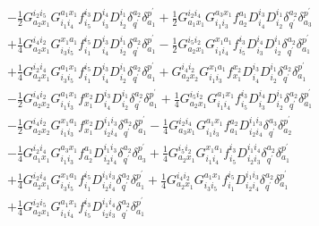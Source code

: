 \documentclass[aip,onecolumn,preprint]{revtex4-1}
\begin{document}
\begin{align}
  & - {{{\frac{1}{2}}}{G^{{i_2}{i_5}}_{{a_2}{x_1}}}{G^{{a_1}{x_1}}_{{i_1}{i_4}}}{f^{{i_3}}_{{i_5}}}{D^{{i_4}}_{{i_3}}}{D^{{i_1}}_{{i_2}}}{\delta^{{a_2}}_{q^\prime}}{\delta^{p^\prime}_{{a_1}}}} + {{{\frac{1}{2}}}{G^{{i_2}{i_4}}_{{a_1}{x_1}}}{G^{{a_3}{x_1}}_{{i_1}{i_3}}}{f^{{a_1}}_{{a_2}}}{D^{{i_3}}_{{i_4}}}{D^{{i_1}}_{{i_2}}}{\delta^{{a_2}}_{q^\prime}}{\delta^{p^\prime}_{{a_3}}}} \nonumber \\
  & + {{{\frac{1}{4}}}{G^{{i_4}{i_2}}_{{a_2}{x_1}}}{G^{{x_1}{a_1}}_{{i_3}{i_5}}}{f^{{i_5}}_{{i_1}}}{D^{{i_3}}_{{i_4}}}{D^{{i_1}}_{{i_2}}}{\delta^{{a_2}}_{q^\prime}}{\delta^{p^\prime}_{{a_1}}}} - {{{\frac{1}{2}}}{G^{{i_5}{i_2}}_{{a_2}{x_1}}}{G^{{x_1}{a_1}}_{{i_1}{i_4}}}{f^{{i_3}}_{{i_5}}}{D^{{i_4}}_{{i_3}}}{D^{{i_1}}_{{i_2}}}{\delta^{{a_2}}_{q^\prime}}{\delta^{p^\prime}_{{a_1}}}} \nonumber \\
  & + {{{\frac{1}{4}}}{G^{{i_2}{i_4}}_{{a_2}{x_1}}}{G^{{a_1}{x_1}}_{{i_3}{i_5}}}{f^{{i_5}}_{{i_1}}}{D^{{i_3}}_{{i_4}}}{D^{{i_1}}_{{i_2}}}{\delta^{{a_2}}_{q^\prime}}{\delta^{p^\prime}_{{a_1}}}} + {{G^{{i_4}{i_2}}_{{a_2}{x_2}}}{G^{{x_1}{a_1}}_{{i_1}{i_3}}}{f^{{x_2}}_{{x_1}}}{D^{{i_3}}_{{i_4}}}{D^{{i_1}}_{{i_2}}}{\delta^{{a_2}}_{q^\prime}}{\delta^{p^\prime}_{{a_1}}}} \nonumber \\
  & - {{{\frac{1}{2}}}{G^{{i_4}{i_2}}_{{a_2}{x_2}}}{G^{{a_1}{x_1}}_{{i_1}{i_3}}}{f^{{x_2}}_{{x_1}}}{D^{{i_3}}_{{i_4}}}{D^{{i_1}}_{{i_2}}}{\delta^{{a_2}}_{q^\prime}}{\delta^{p^\prime}_{{a_1}}}} + {{{\frac{1}{4}}}{G^{{i_5}{i_2}}_{{a_2}{x_1}}}{G^{{a_1}{x_1}}_{{i_1}{i_4}}}{f^{{i_3}}_{{i_5}}}{D^{{i_4}}_{{i_3}}}{D^{{i_1}}_{{i_2}}}{\delta^{{a_2}}_{q^\prime}}{\delta^{p^\prime}_{{a_1}}}} \nonumber \\
  & - {{{\frac{1}{2}}}{G^{{i_4}{i_2}}_{{a_2}{x_2}}}{G^{{x_1}{a_1}}_{{i_1}{i_3}}}{f^{{x_2}}_{{x_1}}}{D^{{i_1}{i_3}}_{{i_2}{i_4}}}{\delta^{{a_2}}_{q^\prime}}{\delta^{p^\prime}_{{a_1}}}} - {{{\frac{1}{4}}}{G^{{i_2}{i_4}}_{{a_3}{x_1}}}{G^{{a_1}{x_1}}_{{i_1}{i_3}}}{f^{{a_2}}_{{a_1}}}{D^{{i_1}{i_3}}_{{i_2}{i_4}}}{\delta^{{a_3}}_{q^\prime}}{\delta^{p^\prime}_{{a_2}}}} \nonumber \\
  & - {{{\frac{1}{4}}}{G^{{i_2}{i_4}}_{{a_1}{x_1}}}{G^{{a_3}{x_1}}_{{i_1}{i_3}}}{f^{{a_1}}_{{a_2}}}{D^{{i_1}{i_3}}_{{i_2}{i_4}}}{\delta^{{a_2}}_{q^\prime}}{\delta^{p^\prime}_{{a_3}}}} + {{{\frac{1}{4}}}{G^{{i_5}{i_2}}_{{a_2}{x_1}}}{G^{{x_1}{a_1}}_{{i_1}{i_4}}}{f^{{i_3}}_{{i_5}}}{D^{{i_1}{i_4}}_{{i_2}{i_3}}}{\delta^{{a_2}}_{q^\prime}}{\delta^{p^\prime}_{{a_1}}}} \nonumber \\
  & + {{{\frac{1}{4}}}{G^{{i_2}{i_4}}_{{a_2}{x_1}}}{G^{{x_1}{a_1}}_{{i_3}{i_5}}}{f^{{i_5}}_{{i_1}}}{D^{{i_1}{i_3}}_{{i_2}{i_4}}}{\delta^{{a_2}}_{q^\prime}}{\delta^{p^\prime}_{{a_1}}}} + {{{\frac{1}{4}}}{G^{{i_4}{i_2}}_{{a_2}{x_1}}}{G^{{a_1}{x_1}}_{{i_3}{i_5}}}{f^{{i_5}}_{{i_1}}}{D^{{i_1}{i_3}}_{{i_2}{i_4}}}{\delta^{{a_2}}_{q^\prime}}{\delta^{p^\prime}_{{a_1}}}} \nonumber \\
  & + {{{\frac{1}{4}}}{G^{{i_2}{i_5}}_{{a_2}{x_1}}}{G^{{a_1}{x_1}}_{{i_1}{i_4}}}{f^{{i_3}}_{{i_5}}}{D^{{i_1}{i_4}}_{{i_2}{i_3}}}{\delta^{{a_2}}_{q^\prime}}{\delta^{p^\prime}_{{a_1}}}}
  \end{align}
\end{document}
